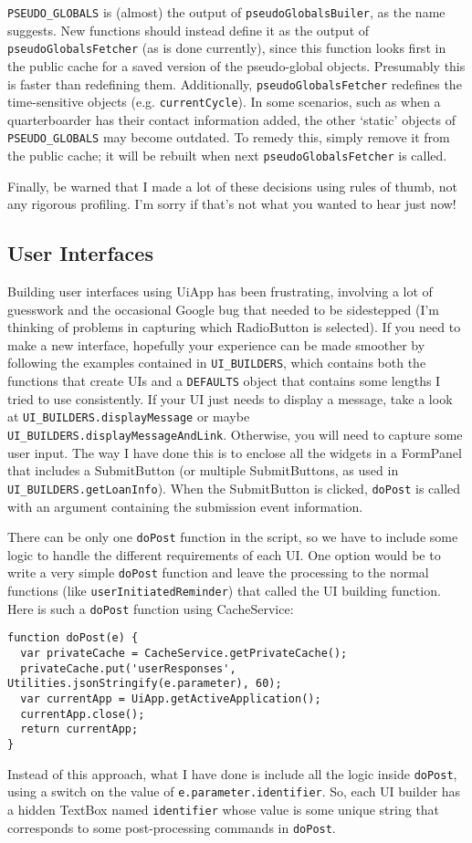 \documentclass{article}
\begin{document}
\texttt{PSEUDO\_GLOBALS} is (almost) the output of \texttt{pseudoGlobalsBuiler}, as the name suggests.
New functions should instead define it as the output of \texttt{pseudoGlobalsFetcher} (as is done currently), since this function looks first in the public cache for a saved version of the pseudo-global objects.
Presumably this is faster than redefining them.
Additionally, \texttt{pseudoGlobalsFetcher} redefines the time-sensitive objects (e.g. \texttt{currentCycle}).
In some scenarios, such as when a quarterboarder has their contact information added, the other `static' objects of \texttt{PSEUDO\_GLOBALS} may become outdated.
To remedy this, simply remove it from the public cache; it will be rebuilt when next \texttt{pseudoGlobalsFetcher} is called.

Finally, be warned that I made a lot of these decisions using rules of thumb, not any rigorous profiling.
I'm sorry if that's not what you wanted to hear just now!

\subsection{User Interfaces}
Building user interfaces using UiApp has been frustrating, involving a lot of guesswork and the occasional Google bug that needed to be sidestepped (I'm thinking of problems in capturing which RadioButton is selected).
If you need to make a new interface, hopefully your experience can be made smoother by following the examples contained in \texttt{UI\_BUILDERS}, which contains both the functions that create UIs and a \texttt{DEFAULTS} object that contains some lengths I tried to use consistently.
If your UI just needs to display a message, take a look at \texttt{UI\_BUILDERS.displayMessage} or maybe \texttt{UI\_BUILDERS.displayMessageAndLink}.
Otherwise, you will need to capture some user input.
The way I have done this is to enclose all the widgets in a FormPanel that includes a SubmitButton (or multiple SubmitButtons, as used in \texttt{UI\_BUILDERS.getLoanInfo}).
When the SubmitButton is clicked, \texttt{doPost} is called with an argument containing the submission event information.

There can be only one \texttt{doPost} function in the script, so we have to include some logic to handle the different requirements of each UI.
One option would be to write a very simple \texttt{doPost} function and leave the processing to the normal functions (like \texttt{userInitiatedReminder}) that called the UI building function.
Here is such a \texttt{doPost} function using CacheService:
\begin{verbatim}
function doPost(e) {
  var privateCache = CacheService.getPrivateCache();
  privateCache.put('userResponses', Utilities.jsonStringify(e.parameter), 60);
  var currentApp = UiApp.getActiveApplication();
  currentApp.close();
  return currentApp;
}
\end{verbatim}
Instead of this approach, what I have done is include all the logic inside \texttt{doPost}, using a switch on the value of \texttt{e.parameter.identifier}.
So, each UI builder has a hidden TextBox named \texttt{identifier} whose value is some unique string that corresponds to some post-processing commands in \texttt{doPost}.
\end{document}
